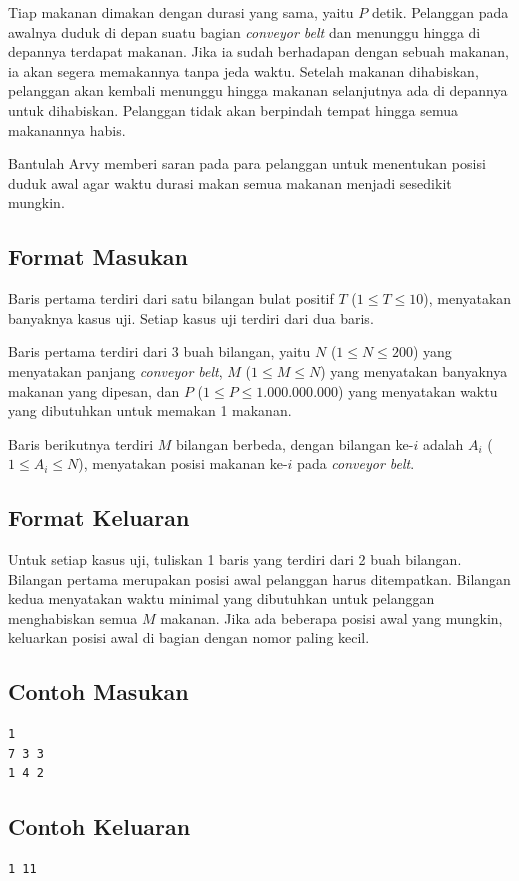 \documentclass{article}
\begin{document}
Tiap makanan dimakan dengan durasi yang sama, yaitu $P$ detik.
Pelanggan pada awalnya duduk di depan suatu bagian \textit{conveyor belt} dan menunggu hingga di depannya terdapat makanan.
Jika ia sudah berhadapan dengan sebuah makanan, ia akan segera memakannya tanpa jeda waktu.
Setelah makanan dihabiskan, pelanggan akan kembali menunggu hingga makanan selanjutnya ada di depannya untuk dihabiskan.
Pelanggan tidak akan berpindah tempat hingga semua makanannya habis.

Bantulah Arvy memberi saran pada para pelanggan untuk menentukan posisi duduk awal agar waktu durasi makan semua makanan menjadi sesedikit mungkin.

\subsection*{Format Masukan}

Baris pertama terdiri dari satu bilangan bulat positif $T$ ($1 \leq T \leq 10$), menyatakan banyaknya kasus uji.
Setiap kasus uji terdiri dari dua baris.

Baris pertama terdiri dari 3 buah bilangan, yaitu $N$ ($1 \leq N \leq 200$) yang menyatakan panjang \textit{conveyor belt}, $M$ ($1 \leq M \leq N$) yang menyatakan banyaknya makanan yang dipesan, dan $P$ ($1 \leq P \leq 1.000.000.000$) yang menyatakan waktu yang dibutuhkan untuk memakan 1 makanan.

Baris berikutnya terdiri $M$ bilangan berbeda, dengan bilangan ke-$i$ adalah $A_i$ ($1 \leq A_i \leq N$), menyatakan posisi makanan ke-$i$ pada \textit{conveyor belt}.

\subsection*{Format Keluaran}

Untuk setiap kasus uji, tuliskan 1 baris yang terdiri dari 2 buah bilangan.
Bilangan pertama merupakan posisi awal pelanggan harus ditempatkan.
Bilangan kedua menyatakan waktu minimal yang dibutuhkan untuk pelanggan menghabiskan semua $M$ makanan.
Jika ada beberapa posisi awal yang mungkin, keluarkan posisi awal di bagian dengan nomor paling kecil.
\\

\begin{multicols}{2}
\subsection*{Contoh Masukan}
\begin{lstlisting}
1
7 3 3
1 4 2
\end{lstlisting}
\columnbreak
\subsection*{Contoh Keluaran}
\begin{lstlisting}
1 11
\end{lstlisting}
\vfill
\null
\end{multicols}
\end{document}
